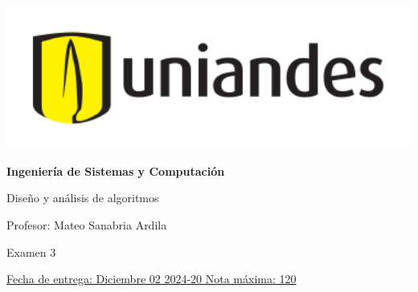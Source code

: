 \documentclass[12pt, a4paper]{exam}
\begin{document}
	\noindent
	\begin{minipage}[l]{0.1\textwidth}
		\noindent
		\includegraphics[width=1.8\textwidth]{Logosimbolo-uniandes_horizontal.png}
	\end{minipage}
\hfill
\begin{minipage}[c]{0.8\textwidth}
	\begin{center}
		{\large \textbf{Ingeniería de Sistemas y Computación} \par
		\large	Diseño y análisis de algoritmos	\par
		\small  Profesor: Mateo Sanabria Ardila	\par
		\small  Examen 3	\par
		}
	\end{center}
\end{minipage}
\par
\vspace{0.2in}
\noindent
\uline{Fecha de entrega: Diciembre 02 	\hfill  2024-20		\hfill Nota máxima: 120}
\par 
\vspace{0.15in}
\end{document}
